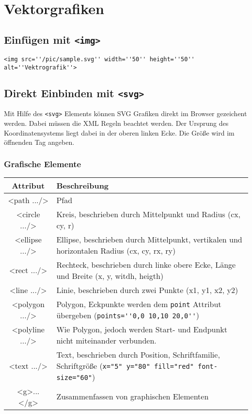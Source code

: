 \section{Vektorgrafiken}
\subsection{Einfügen mit \texttt{<img>}}
 \begin{verbatim}
<img src=''/pic/sample.svg'' width=''50'' height=''50'' alt=''Vektrografik''>
\end{verbatim}
\subsection{Direkt Einbinden mit \texttt{<svg>}}
Mit Hilfe des \texttt{<svg>} Elements können SVG Grafiken direkt im Browser gezeichent werden. Dabei müssen die XML Regeln beachtet werden. Der Ursprung des Koordinatensystems liegt dabei in der oberen linken Ecke. Die Größe wird im öffnenden Tag angeben.
\subsubsection{Grafische Elemente}
\begin{tabular}{|c|p{10cm}|}
\hline
\rowcolor{lstback}\textbf{Attribut}	&\textbf{Beschreibung}\\
\hline
<path .../>		&Pfad\\
\hline
<circle .../>		&Kreis, beschrieben durch Mittelpunkt und Radius (cx, cy, r)\\
\hline
<ellipse .../>	&Ellipse, beschrieben durch Mittelpunkt, vertikalen und horizontalen Radius (cx, cy, rx, ry)\\
\hline
<rect .../>		&Rechteck, beschrieben durch linke obere Ecke, Länge und Breite (x, y, witdh, heigth)\\
\hline
<line .../>		&Linie, beschrieben durch zwei Punkte (x1, y1, x2, y2)\\
\hline
<polygon .../>	&Polygon, Eckpunkte werden dem \texttt{point} Attribut übergeben (\verb&points=''0,0 10,10 20,0''&)\\
\hline
<polyline .../>	&Wie Polygon, jedoch werden Start- und Endpunkt nicht miteinander verbunden.\\
\hline
<text .../>		&Text, beschrieben durch Position, Schriftfamilie, Schriftgröße (\verb&x="5" y="80" fill="red" font-size="60"&)\\
\hline
<g>...</g>		&Zusammenfassen von graphischen Elementen\\
\hline
\end{tabular}
